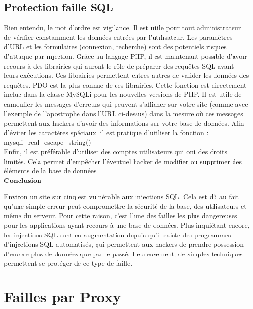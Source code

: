 \newpage
\subsection{Protection faille SQL}

Bien entendu, le mot d’ordre est vigilance. Il est utile pour tout administrateur de vérifier constamment les données entrées par l’utilisateur. Les paramètres d’URL et les formulaires (connexion, recherche) sont des potentiels risques d’attaque par injection.
Grâce au langage PHP, il est maintenant possible d’avoir recours à des librairies qui auront le rôle de préparer des requêtes SQL avant leurs exécutions. Ces librairies permettent entres autres de valider les données des requêtes.
PDO est la plus connue de ces librairies. Cette fonction est directement inclue dans la classe MySQLi pour les nouvelles versions de PHP.
Il est utile de camoufler les messages d’erreurs qui peuvent s’afficher sur votre site (comme avec l’exemple de l’apostrophe dans l’URL ci-dessus) dans la mesure où ces messages permettent aux hackers d’avoir des informations sur votre base de données. 
Afin d’éviter les caractères spéciaux, il est pratique d’utiliser la fonction :\\ mysqli\_real\_escape\_string()\\
Enfin, il est préférable d’utiliser des comptes utilisateurs qui ont des droits limités. Cela permet d’empêcher l'éventuel hacker de modifier ou supprimer des éléments de la base de données.\\

 \textbf{Conclusion}

Environ un site sur cinq est vulnérable aux injections SQL. Cela est dû au fait qu’une simple erreur peut compromettre la sécurité de la base, des utilisateurs et même du serveur. Pour cette raison, c’est l’une des failles les plus dangereuses pour les applications ayant recours à une base de données. Plus inquiétant encore, les injections SQL sont en augmentation depuis qu'il existe des programmes d'injections SQL automatisés, qui permettent aux hackers de prendre possession d’encore plus de données que par le passé. Heureusement, de simples techniques permettent se protéger de ce type de faille.







\newpage
\section{Failles par Proxy}

